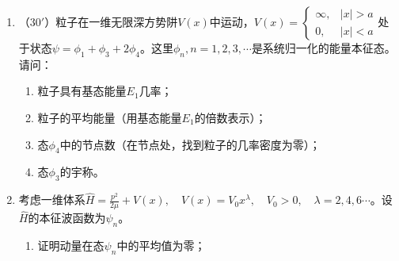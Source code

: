 


\begin{enumerate}
	\item
（$30'$）粒子在一维无限深方势阱$V(x)$中运动，$V(x)=\begin{cases}\infty,&|x|>a\\0,&|x|<a\end{cases}$处于状态$\psi=\phi_1+\phi_3+2\phi_4$。这里$\phi_n,n=1,2,3,\cdots$是系统归一化的能量本征态。请问：
\begin{enumerate}
	\item
粒子具有基态能量$E_1$几率；
\item 
粒子的平均能量（用基态能量$E_1$的倍数表示）；
\item 
态$\phi_4$中的节点数（在节点处，找到粒子的几率密度为零）；
\item 
态$\phi_3$的宇称。

\end{enumerate}



\item 
考虑一维体系$\hat{H}=\frac{p^2}{2\mu}+V(x),\quad V(x)=V_0x^\lambda,\quad V_0>0,\quad \lambda=2,4,6\cdots$。设$\hat{H}$的本征波函数为$\psi_n$。
\begin{enumerate}
	\item
证明动量在态$\psi_n$中的平均值为零；


\end{enumerate}
\end{enumerate}
